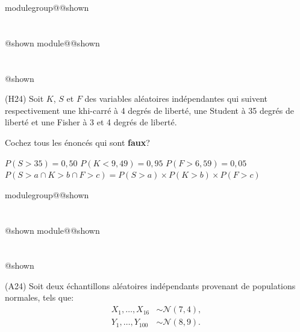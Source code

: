 \documentclass{Evaluation}
\makeatletter
\newcommand{\currentmodulekey}{}
\newcommand{\currentmoduletitle}{}
\newcommand{\currentgroupkey}{}
\newcommand{\currentgrouptitle}{}
\newcommand{\showmoduleifneeded}{%
  \ifx\currentgroupkey\empty\else
    \expandafter\ifx\csname modulegroup@\currentgroupkey @shown\endcsname\relax
      \section*{\currentgrouptitle}%
      \expandafter\gdef\csname modulegroup@\currentgroupkey @shown\endcsname{1}%
    \fi
  \fi
  \expandafter\ifx\csname module@\currentmodulekey @shown\endcsname\relax
    \section*{\currentmoduletitle}%
    \expandafter\gdef\csname module@\currentmodulekey @shown\endcsname{1}%
  \fi
}
\newenvironment{H24}{\showmoduleifneeded}{}
\newenvironment{A24}{\showmoduleifneeded}{}
\makeatother
\begin{document}
\begin{questions}
\begin{H24}
\question (H24) Soit $K$, $S$ et $F$ des variables aléatoires indépendantes qui suivent respectivement une khi-carré à 4 degrés de liberté, une Student à 35 degrés de liberté et une Fisher à 3 et 4 degrés de liberté. 

Cochez tous les énoncés qui sont \textbf{faux}?

\begin{checkboxes}
		\correctchoice $P(S>35)=0,50$
		\choice $P(K<9,49)=0,95$
		\choice $P(F>6,59)=0,05$
		\choice $P(S>a \cap K> b \cap F >c)= P(S>a)\times P(K>b)\times P(F>c)$
\end{checkboxes}
\end{H24}

\begin{A24}
\question (A24) Soit deux échantillons aléatoires indépendants provenant de populations normales, tels que:
\begin{align*}
    X_1,\hdots,X_{16}&\sim\mathcal{N}(7, 4),\\
    Y_1,\hdots,Y_{100}&\sim\mathcal{N}(8, 9).
\end{align*}

\end{A24}
\end{questions}
\end{document}
